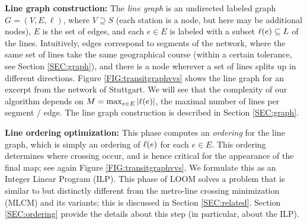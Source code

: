 \documentclass{llncs}
\begin{document}



\smallskip\noindent
{\bf Line graph construction:}
The \emph{line graph} is an undirected labeled graph $G = (V, E, \ell)$, where $V \supseteq S$ (each station is a node, but here may be additional nodes), $E$ is the set of edges, and each $e \in E$ is labeled with a subset $\ell(e) \subseteq L$ of the lines.
Intuitively, edges correspond to segments of the network, where the same set of lines take the same geographical course (within a certain tolerance, see Section \ref{SEC:graph}), and there is a node wherever a set of lines splits up in different directions.
Figure \ref{FIG:transitgraphvvs} shows the line graph for an excerpt from the network of Stuttgart.
We will see that the complexity of our algorithm depends on $M = \max_{e \in E} |\ell(e)|$, the maximal number of lines per segment / edge.
The line graph construction is described in Section \ref{SEC:graph}.

\smallskip\noindent
{\bf Line ordering optimization:}
This phase computes an \emph{ordering} for the line graph, which is simply an ordering of $\ell(e)$ for each $e \in E$.
This ordering determines where crossing occur, and is hence critical for the appearance of the final map; see again Figure \ref{FIG:transitgraphvvs}.
We formulate this as an Integer Linear Program (ILP).
This phase of LOOM solves a problem that is similar to but distinctly different from the metro-line crossing minimization (MLCM) \cite{bek07} and its variants; this is discussed in Section \ref{SEC:related}.
Section \ref{SEC:ordering} provide the details about this step (in particular, about the ILP).
\end{document}
